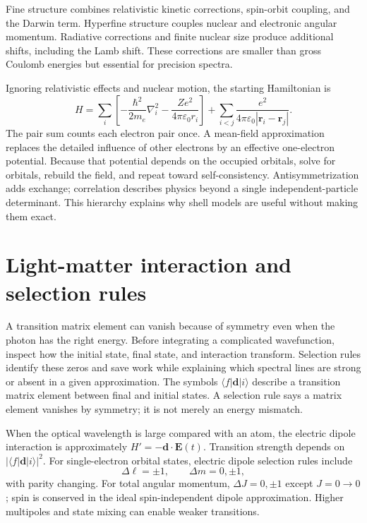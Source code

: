 \documentclass[11pt,oneside]{book}
\newcommand{\vect}[1]{\boldsymbol{#1}}
\newcommand{\lap}{\nabla^2}
\newcommand{\ket}[1]{\lvert #1\rangle}
\newcommand{\bra}[1]{\langle #1\rvert}
\newcommand{\eps}{\varepsilon_0}
\theoremstyle{reviewstyle}
\begin{document}
Fine structure combines relativistic kinetic corrections, spin-orbit coupling, and the Darwin term. Hyperfine structure couples nuclear and electronic angular momentum. Radiative corrections and finite nuclear size produce additional shifts, including the Lamb shift. These corrections are smaller than gross Coulomb energies but essential for precision spectra.

Ignoring relativistic effects and nuclear motion, the starting Hamiltonian is
\begin{equation}
H=\sum_i\left[-\frac{\hbar^2}{2m_e}\lap_i-\frac{Ze^2}{4\pi\eps r_i}\right]
+\sum_{i<j}\frac{e^2}{4\pi\eps|\vect r_i-\vect r_j|}.
\end{equation}
The pair sum counts each electron pair once. A mean-field approximation replaces the detailed influence of other electrons by an effective one-electron potential. Because that potential depends on the occupied orbitals, solve for orbitals, rebuild the field, and repeat toward self-consistency. Antisymmetrization adds exchange; correlation describes physics beyond a single independent-particle determinant. This hierarchy explains why shell models are useful without making them exact.

\section{Light-matter interaction and selection rules}
A transition matrix element can vanish because of symmetry even when the photon has the right energy. Before integrating a complicated wavefunction, inspect how the initial state, final state, and interaction transform. Selection rules identify these zeros and save work while explaining which spectral lines are strong or absent in a given approximation. The symbols $\bra f\vect d\ket i$ describe a transition matrix element between final and initial states. A selection rule says a matrix element vanishes by symmetry; it is not merely an energy mismatch.

When the optical wavelength is large compared with an atom, the electric dipole interaction is approximately $H'=-\vect d\cdot\vect E(t)$. Transition strength depends on $|\bra f\vect d\ket i|^2$. For single-electron orbital states, electric dipole selection rules include
\begin{equation}\Delta\ell=\pm1,\qquad \Delta m=0,\pm1,\end{equation}
with parity changing. For total angular momentum, $\Delta J=0,\pm1$ except $J=0\to0$; spin is conserved in the ideal spin-independent dipole approximation. Higher multipoles and state mixing can enable weaker transitions.
\end{document}
